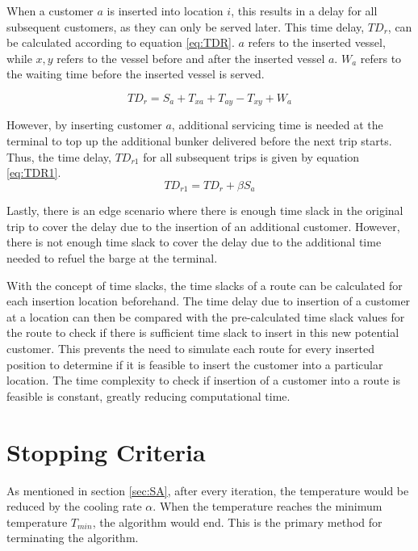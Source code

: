 When a customer $a$ is inserted into location $i$, this results in a delay for all subsequent customers, as they can only be served later. This time delay, $TD_{r}$, can be calculated according to equation \ref{eq:TDR}. $a$ refers to the inserted vessel, while $x, y$ refers to the vessel before and after the inserted vessel $a$. $W_{a}$ refers to the waiting time before the inserted vessel is served.

\begin{equation} \label{eq:TDR}
TD_{r} = S_{a} + T_{xa} + T_{ay} - T_{xy} + W_{a}
\end{equation}

However, by inserting customer $a$, additional servicing time is needed at the terminal to top up the additional bunker delivered before the next trip starts. Thus, the time delay, $TD_{r1}$ for all subsequent trips is given by equation \ref{eq:TDR1}.
\begin{equation} \label{eq:TDR1}
TD_{r1} = TD_{r} + \beta S_{a}
\end{equation}

Lastly, there is an edge scenario where there is enough time slack in the original trip to cover the delay due to the insertion of an additional customer. However, there is not enough time slack to cover the delay due to the additional time needed to refuel the barge at the terminal.

With the concept of time slacks, the time slacks of a route can be calculated for each insertion location beforehand. The time delay due to insertion of a customer at a location can then be compared with the pre-calculated time slack values for the route to check if there is sufficient time slack to insert in this new potential customer. This prevents the need to simulate each route for every inserted position to determine if it is feasible to insert the customer into a particular location. The time complexity to check if insertion of a customer into a route is feasible is constant, greatly reducing computational time.

\section{Stopping Criteria}
As mentioned in section \ref{sec:SA}, after every iteration, the temperature would be reduced by the cooling rate $\alpha$. When the temperature reaches the minimum temperature $T_{min}$, the algorithm would end. This is the primary method for terminating the algorithm.

